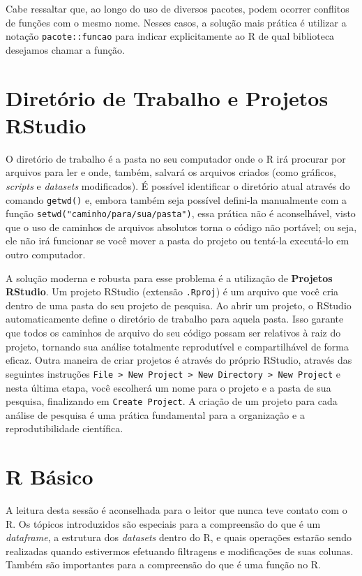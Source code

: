 \documentclass[
  12pt,
  letterpaper,
  DIV=11,
  numbers=noendperiod]{scrreprt}
\begin{document}
Cabe ressaltar que, ao longo do uso de diversos pacotes, podem ocorrer
conflitos de funções com o mesmo nome. Nesses casos, a solução mais
prática é utilizar a notação \texttt{pacote::funcao} para indicar
explicitamente ao R de qual biblioteca desejamos chamar a função.

\section{Diretório de Trabalho e Projetos
RStudio}\label{diretuxf3rio-de-trabalho-e-projetos-rstudio}

O diretório de trabalho é a pasta no seu computador onde o R irá
procurar por arquivos para ler e onde, também, salvará os arquivos
criados (como gráficos, \emph{scripts} e \emph{datasets} modificados). É
possível identificar o diretório atual através do comando
\texttt{getwd()} e, embora também seja possível defini-la manualmente
com a função \texttt{setwd("caminho/para/sua/pasta")}, essa prática não
é aconselhável, visto que o uso de caminhos de arquivos absolutos torna
o código não portável; ou seja, ele não irá funcionar se você mover a
pasta do projeto ou tentá-la executá-lo em outro computador.

A solução moderna e robusta para esse problema é a utilização de
\textbf{Projetos RStudio}. Um projeto RStudio (extensão \texttt{.Rproj})
é um arquivo que você cria dentro de uma pasta do seu projeto de
pesquisa. Ao abrir um projeto, o RStudio automaticamente define o
diretório de trabalho para aquela pasta. Isso garante que todos os
caminhos de arquivo do seu código possam ser relativos à raiz do
projeto, tornando sua análise totalmente reprodutível e compartilhável
de forma eficaz. Outra maneira de criar projetos é através do próprio
RStudio, através das seguintes instruções
\texttt{File\ \textgreater{}\ New\ Project\ \textgreater{}\ New\ Directory\ \textgreater{}\ New\ Project}
e nesta última etapa, você escolherá um nome para o projeto e a pasta de
sua pesquisa, finalizando em \texttt{Create\ Project}. A criação de um
projeto para cada análise de pesquisa é uma prática fundamental para a
organização e a reprodutibilidade científica.

\section{R Básico}\label{r-buxe1sico}

A leitura desta sessão é aconselhada para o leitor que nunca teve
contato com o R. Os tópicos introduzidos são especiais para a
compreensão do que é um \emph{dataframe}, a estrutura dos
\emph{datasets} dentro do R, e quais operações estarão sendo realizadas
quando estivermos efetuando filtragens e modificações de suas colunas.
Também são importantes para a compreensão do que é uma função no R.
\end{document}
